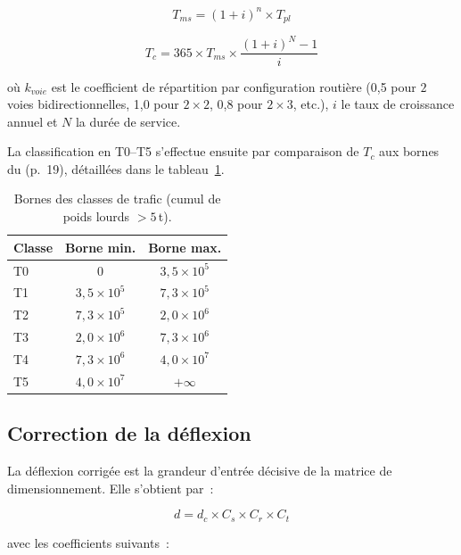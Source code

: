 \begin{equation}
  T_{ms} = (1+i)^{n} \times T_{pl}
  \label{eq:tms}
\end{equation}

\begin{equation}
  T_c = 365 \times T_{ms} \times \frac{(1+i)^{N} - 1}{i}
  \label{eq:tc}
\end{equation}

où $k_{voie}$ est le coefficient de répartition par configuration
routière (0,5 pour $2$ voies bidirectionnelles, 1,0 pour $2\times2$,
0,8 pour $2\times3$, etc.), $i$ le taux de croissance annuel et $N$ la
durée de service.

La classification en T0--T5 s'effectue ensuite par comparaison de
$T_c$ aux bornes du \cttp{} (p.~19), détaillées dans le
tableau~\ref{tab:trafic}.

\begin{table}[H]
\centering
\caption{Bornes des classes de trafic (cumul de poids lourds $>5$\,t).}
\label{tab:trafic}
\begin{tabular}{@{}lcc@{}}
\toprule
\bfseries Classe & \bfseries Borne min. & \bfseries Borne max. \\
\midrule
T0 & 0         & $3{,}5 \times 10^{5}$ \\
T1 & $3{,}5 \times 10^{5}$ & $7{,}3 \times 10^{5}$ \\
T2 & $7{,}3 \times 10^{5}$ & $2{,}0 \times 10^{6}$ \\
T3 & $2{,}0 \times 10^{6}$ & $7{,}3 \times 10^{6}$ \\
T4 & $7{,}3 \times 10^{6}$ & $4{,}0 \times 10^{7}$ \\
T5 & $4{,}0 \times 10^{7}$ & $+\infty$ \\
\bottomrule
\end{tabular}
\end{table}

\subsection{Correction de la déflexion}
\label{sec:deflexion}

La déflexion corrigée est la grandeur d'entrée décisive de la matrice
de dimensionnement. Elle s'obtient par~:

\begin{equation}
  d = d_c \times C_s \times C_r \times C_t
  \label{eq:deflexion}
\end{equation}

avec les coefficients suivants~:

